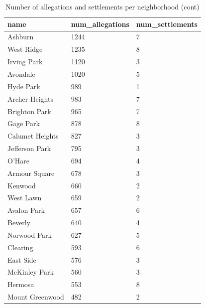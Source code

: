 \documentclass{article}
\begin{document}
\begin{table}[h!]
\centering
\caption{Number of allegations and settlements per neighborhood (cont)}
\label{table5}
\begin{tabular}{|l|l|l|}
\hline
name                   & num\_allegations & num\_settlements \\
\hline
Ashburn                & 1244             & 7                \\
West Ridge             & 1235             & 8                \\
Irving Park            & 1120             & 3                \\
Avondale               & 1020             & 5                \\
Hyde Park              & 989              & 1                \\
Archer Heights         & 983              & 7                \\
Brighton Park          & 965              & 7                \\
Gage Park              & 878              & 8                \\
Calumet Heights        & 827              & 3                \\
Jefferson Park         & 795              & 3                \\
O'Hare                 & 694              & 4                \\
Armour Square          & 678              & 3                \\
Kenwood                & 660              & 2                \\
West Lawn              & 659              & 2                \\
Avalon Park            & 657              & 6                \\
Beverly                & 640              & 4                \\
Norwood Park           & 627              & 5                \\
Clearing               & 593              & 6                \\
East Side              & 576              & 3                \\
McKinley Park          & 560              & 3                \\
Hermosa                & 553              & 8                \\
Mount Greenwood        & 482              & 2                \\

\end{tabular}
\end{table}
\end{document}
